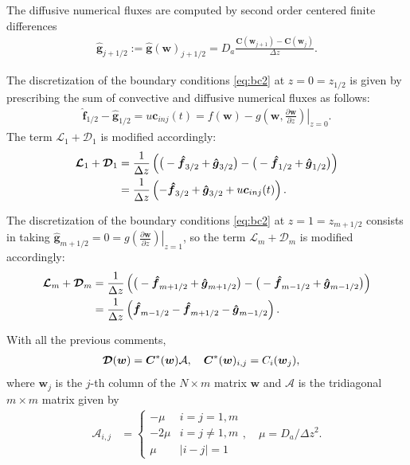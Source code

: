 \documentclass[preprint]{elsarticle}
\theoremstyle{definition}
\newcommand{\bw}{\boldsymbol w}
\newcommand{\bc}{\boldsymbol c}
\newcommand{\bC}{\boldsymbol C}
\def\boc#1{\boldsymbol{{\cal #1}}}
\def\mD{\boc{D}}
\def\bh#1{\boldsymbol{\hat{#1}}}
\begin{document}
The diffusive numerical fluxes are computed by second order
  centered finite differences
  \begin{align*}    \bh{g}_{j+1/2}:=\bh{g}(\bw)_{j+1/2}=D_a\frac{\bC(\bw_{j+1})-\bC(\bw_{j})}{\Delta
    z}.
  \end{align*}    


The discretization of the boundary conditions \eqref{eq:bc2} at
  $z=0=z_{1/2}$ is
given by prescribing the sum of convective and diffusive numerical
fluxes as follows:
\begin{align*}  \bh{f}_{1/2}-\bh{g}_{1/2}=u \bc_{inj}(t)=\left.f(\bw)-g\left(\bw, \frac{\partial \bw}{\partial
    z}\right)\right|_{z=0}.
\end{align*}
The term $\mathcal{L}_{1}+\mathcal{D}_{1}$ is modified accordingly:
\begin{align*}
\boldsymbol{{\cal L}}_1+\boldsymbol{{\cal D}}_1 &= \frac{1}{\Delta z} \left(
  \big(-\bh{f}_{3/2}+\bh{g}_{3/2}\big)-\big(-\bh{f}_{1/2}+\bh{g}_{1/2}\big)\right)\\
&= \frac{1}{\Delta z} \left(
  -\bh{f}_{3/2}+\bh{g}_{3/2}+u\bc_{inj}(t)\right).
\end{align*}


The discretization of the boundary conditions \eqref{eq:bc2} at
  $z=1=z_{m+1/2}$ consists in taking  $\bh{g}_{m+1/2}=0=\left.g\left(\frac{\partial \bw}{\partial
    z}\right)\right|_{z=1}$, so the term
$\mathcal{L}_{m}+\mathcal{D}_{m}$ is modified accordingly:
\begin{align*}
\boldsymbol{{\cal L}}_{m}+\boldsymbol{{\cal D}}_{m} &= \frac{1}{\Delta z} \left(
  \big(-\bh{f}_{m+1/2}+\bh{g}_{m+1/2}\big)-\big(-\bh{f}_{m-1/2}+\bh{g}_{m-1/2}\big)\right)\\
&= \frac{1}{\Delta z} \left(
  \bh{f}_{m-1/2}
  -\bh{f}_{m+1/2}-\bh{g}_{m-1/2}\right).
\end{align*}




With all the previous comments,
\begin{align*}
  \mD(\bw)&=\boldsymbol{C}^*(\bw)\mathcal{A},\quad
  \boldsymbol{C}^*(\bw)_{i,j}=C_i(\bw_j),
\end{align*}
where $\bw_j$ is the $j$-th column of the $N\times m$ matrix $\bw$ and
$\mathcal{A}$ is  the tridiagonal
$m\times m$ matrix  given by
\begin{align}\label{eq:207}
\mathcal{A}_{i,j}&=\begin{cases} -\mu & i=j=1,m\\
    -2\mu & i=j\neq 1,m\\
    \mu & |i-j|=1
  \end{cases},\quad \mu=D_a/\Delta z^2.
\end{align}
\end{document}
